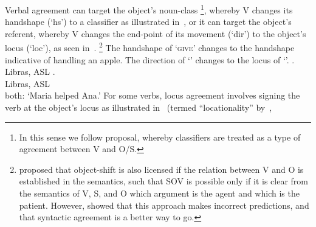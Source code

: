 \documentclass[output=paper]{langscibook}
\begin{document}
    \z 
\z
Verbal agreement can target the object's noun-class%
\footnote{%
    In this sense we follow  proposal, whereby
    classifiers are treated as a type of agreement between V and O/S.
}, 
whereby V
changes its handshape (`hs') to a classifier as illustrated in~, or it
can target the object's referent, whereby V changes the end-point of its
movement (`dir') to the object's locus (`loc'), as seen in~.%
\footnote{
    \citet{Fischer.1975} proposed that object-shift is also licensed if the relation
    between V and O is established in the semantics, such that SOV is possible only if it
    is clear from the semantics of V, S, and O which argument is the agent and which is
    the patient. However, \citet{Liddell.1980} showed that this approach makes incorrect
    predictions, and that syntactic agreement is a better way to go.
}
\ea 
    \label{lasz:ex:3}
    The handshape of `\textsc{give}' changes to the \laszClaw{} handshape indicative of handling an apple. 
    \z 
\ex
    \label{lasz:ex:4}
    The direction of `' changes to the locus of `'. 
    \ea 
            . \\
        \citep[from][6]{Quadros.etal.2004}
        \hfill 
        \cmark Libras, \cmark ASL 
    \ex 
            . \\
        \citep[from][5]{Quadros.etal.2004} 
        \hfill 
        \cmark Libras, \cmark ASL \\
        both: `Maria helped Ana.'
    \z 
\z 
For some verbs, locus agreement involves signing the verb at the
object's locus as illustrated in~ (termed ``locationality'' by~\citealp{Fischer.Gough.1978}, 
\end{document}
